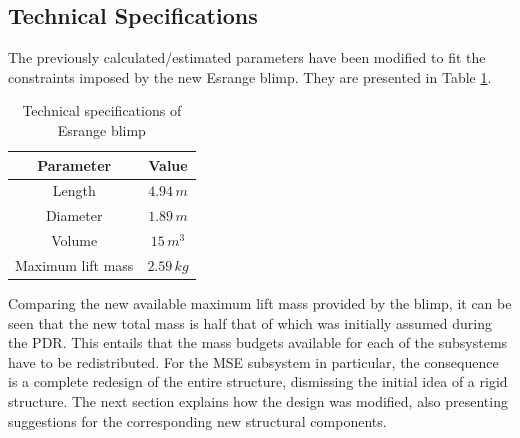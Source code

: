 \subsection{Technical Specifications}
%
The previously calculated/estimated parameters have been modified to fit the constraints imposed by the new Esrange blimp. They are presented in Table \ref{tab:technical}.
%
\begin{table}[H]
\centering
\caption{Technical specifications of Esrange blimp}
\label{tab:technical}
\begin{tabular}{c c}
\hline
\textbf{Parameter} & \textbf{Value}\\ \hline
Length & $4.94\,m$\\
Diameter & $1.89\,m$\\
Volume & $15\,m^3$\\
Maximum lift mass & $2.59\,kg$\\
\hline
\end{tabular}
\end{table}
%
%
\noindent
Comparing the new available maximum lift mass provided by the blimp, it can be seen that the new total mass is half that of which was initially assumed during the \ac{PDR}. This entails that the mass budgets available for each of the subsystems have to be redistributed. For the \ac{MSE} subsystem in particular, the consequence is a complete redesign of the entire structure, dismissing the initial idea of a rigid structure. The next section explains how the design was modified, also presenting suggestions for the corresponding new structural components.
%
